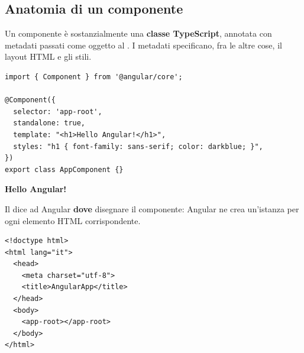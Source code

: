 \subsection{Anatomia di un componente}

Un componente è sostanzialmente una \textbf{classe TypeScript}, annotata con
metadati passati come oggetto al  . I metadati
specificano, fra le altre cose, il layout HTML e gli stili.

\begin{affianco}[0.5][c]
\codicepiccolo
\begin{lstlisting}[style=ts, name=app.component.ts]
import { Component } from '@angular/core';

@Component({
  selector: 'app-root',
  standalone: true,
  template: "<h1>Hello Angular!</h1>",
  styles: "h1 { font-family: sans-serif; color: darkblue; }",
})
export class AppComponent {}
\end{lstlisting}
\risultato
\begin{browser}[AngularApp]
  {\Lato\bfseries\LARGE\color{css-darkblue} Hello Angular!\par}
\end{browser}
\end{affianco}

Il  dice ad Angular \textbf{dove} disegnare il componente:
Angular ne crea un'istanza per ogni elemento HTML corrispondente.

\begin{affianco}[0.42][c]
\begin{lstlisting}[style=html, name=index.html]
<!doctype html>
<html lang="it">
  <head>
    <meta charset="utf-8">
    <title>AngularApp</title>
  </head>
  <body>
    <app-root></app-root>
  </body>
</html>
\end{lstlisting}
\risultato
\begin{immagine}
\end{immagine}
\end{affianco}


